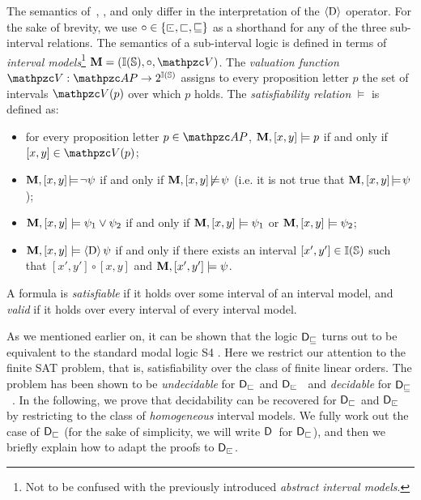 The semantics of~\Dstr, \Dirr, and \Dref only differ in the
interpretation of the $\operatorname{\langle D\rangle}$ operator. For the sake of brevity, we use
$\circ \in \{\ssubint,\subint,\subinteq \}$ as a shorthand for
any of the three sub-interval relations. The semantics of a
sub-interval logic \Dsim is defined in terms of \emph{interval models}\footnote{Not to be confused with the previously introduced \emph{abstract interval models}.}
$\bM=(\mathbb{I(S)},\circ,\cV)$. The \emph{valuation
function} $\cV : \AP \to 2^{\mathbb{I(S)}}$ assigns to
every proposition letter $p$ the set of intervals $\cV(p)$ over
which $p$ holds. The \emph{satisfiability relation} $\models$ is
defined as:
%
\begin{itemize}
  \item for every proposition letter  $p \in \AP$, $\mathbf{M}, [x,y]
        \models p$ if and only if $[x,y] \in \cV(p)$;

  \item $\mathbf{M}, [x,y] \!\models\! \neg \psi$ if and only if $\mathbf{M}, [x,y]
        \!\not\models\! \psi$ (i.e. it is not true that $\mathbf{M}, [x,y]
        \!\models\! \psi$);

  \item $\mathbf{M}, [x,y] \models \psi_1 \vee \psi_2$ if and only if $\mathbf{M}, [x,y] \models \psi_1$ or $\mathbf{M}, [x,y] \models \psi_2$;

  \item $\mathbf{M}, [x,y] \models \operatorname{\langle D\rangle} \psi$ if and only if there exists an interval $[x',y'] \in
        \mathbb{I}(\mathbb{S})$ such that $[x',y'] \circ [x,y]$ and
        $\mathbf{M}, [x',y'] \models \psi$.
\end{itemize}
%
A \Dsim formula is \emph{satisfiable} if it holds over some interval of an interval model, and \emph{valid} if it holds over every interval of every interval model.

As we mentioned earlier on, it can be shown that the logic $\textsf{D$_\sqsubseteq$}$ turns out to be equivalent to the standard modal logic S4 \cite{DBLP:journals/jphil/Benthem91}. 
%
Here we restrict our attention to the finite SAT problem, that is, satisfiability over the class of finite linear orders. The problem has been shown to be \emph{undecidable} for $\textsf{D$_\sqsubset$}$ and $\Dstr$~\cite{DBLP:journals/fuin/MarcinkowskiM14} and \emph{decidable} for $\textsf{D$_\sqsubseteq$}$~\cite{DBLP:conf/time/MontanariPS10}. In the following, we prove that decidability can be recovered for $\textsf{D$_\sqsubset$}$ and $\Dstr$ by restricting to the class of \emph{homogeneous} interval models. We fully work out the case of $\textsf{D$_\sqsubset$}$ (for the sake of simplicity, we will write $\mathsf{D}$\ for $\textsf{D$_\sqsubset$}$), and then we briefly explain how to adapt the proofs to $\Dstr$. 

